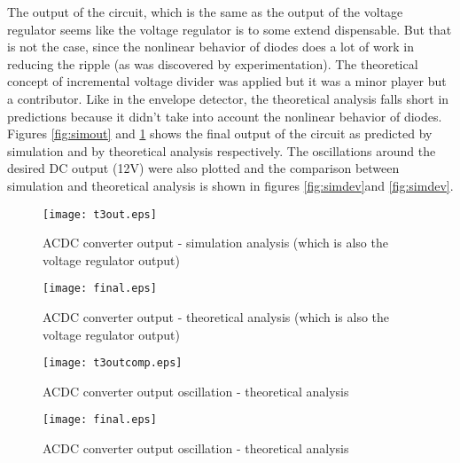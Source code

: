 The output of the circuit, which is the same as the output of the voltage regulator seems like the voltage regulator is to some extend dispensable. But that is not the case, since the nonlinear behavior of diodes does a lot of work in reducing the ripple (as was discovered by experimentation). The theoretical concept of incremental voltage divider was applied but it was a minor player but a contributor. Like in the envelope detector, the theoretical analysis falls short in predictions because it didn't take into account the nonlinear behavior of diodes. Figures \ref{fig:simout} and \ref{fig:compout} shows the final output of the circuit as predicted by simulation and by theoretical analysis respectively. The oscillations around the desired DC output (12V) were also plotted and the comparison between simulation and theoretical analysis is shown in figures \ref{fig:simdev}and  \ref{fig:simdev}.




\begin{figure}[h] \centering
  \begin{minipage}{.45\textwidth}
    \texttt{[image: t3out.eps]}
    \caption{ACDC converter output - simulation analysis (which is also the voltage regulator output)}
    \label{fig:simout}
  \end{minipage}%
  \hspace{2 mm}
  \begin{minipage}{.45\textwidth}
  \centering
    \texttt{[image: final.eps]}
    \caption{ACDC converter output - theoretical analysis (which is also the voltage regulator output)}
    \label{fig:compout}
      \end{minipage}%
\end{figure}

\begin{figure}[h] \centering
  \begin{minipage}{.45\textwidth}
    \texttt{[image: t3outcomp.eps]}
    \caption{ACDC converter output oscillation - theoretical analysis}
    \label{fig:simdev}
  \end{minipage}%
    \hspace{2 mm}
  \begin{minipage}{.45\textwidth}
  \centering
    \texttt{[image: final.eps]}
    \caption{ACDC converter output oscillation - theoretical analysis}
    \label{fig:compdev}
      \end{minipage}%
\end{figure}

